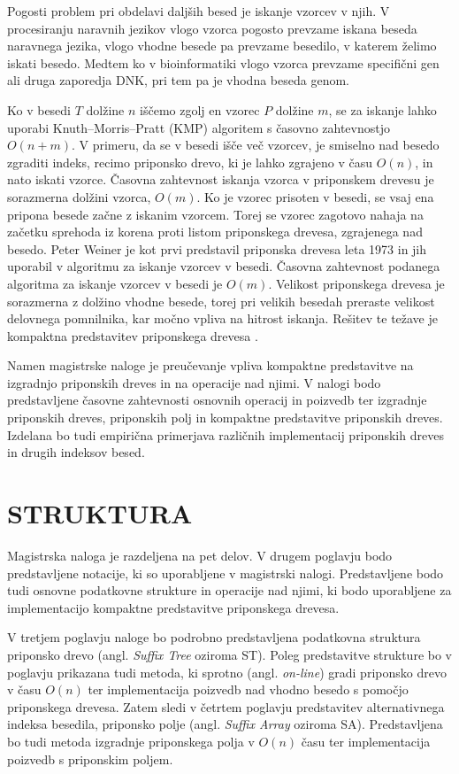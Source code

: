 Pogosti problem pri obdelavi daljših besed je iskanje vzorcev v njih. V procesiranju naravnih jezikov vlogo vzorca pogosto prevzame iskana beseda naravnega jezika, vlogo vhodne besede pa  prevzame besedilo, v katerem želimo iskati besedo. Medtem ko v bioinformatiki vlogo vzorca prevzame specifični gen ali druga zaporedja DNK, pri tem pa je vhodna beseda genom. 

Ko v besedi $T$ dolžine $n$ iščemo zgolj en vzorec $P$ dolžine $m$, se za iskanje lahko uporabi Knuth–Morris–Pratt (KMP) algoritem s časovno zahtevnostjo $O(n+m)$. V primeru, da se v besedi išče več vzorcev, je smiselno nad besedo zgraditi indeks, recimo priponsko drevo, ki je lahko zgrajeno v času $O(n)$, in nato iskati vzorce. Časovna zahtevnost iskanja vzorca v priponskem drevesu je sorazmerna dolžini vzorca, $O(m)$. Ko je vzorec prisoten v besedi, se vsaj ena pripona besede začne z iskanim vzorcem. 
Torej se vzorec zagotovo nahaja na začetku sprehoda iz korena proti listom priponskega drevesa, zgrajenega nad besedo. 
Peter Weiner je kot prvi predstavil priponska drevesa leta 1973 \cite{Weiner1973} in jih uporabil v algoritmu za iskanje vzorcev v besedi. Časovna zahtevnost podanega algoritma za iskanje vzorcev v besedi je $O(m)$. Velikost priponskega drevesa je sorazmerna z dolžino vhodne besede, torej pri velikih besedah preraste velikost delovnega pomnilnika, kar močno vpliva na hitrost iskanja. Rešitev te težave je kompaktna predstavitev priponskega drevesa \cite{Navarro2016}.

Namen magistrske naloge je preučevanje vpliva kompaktne predstavitve na izgradnjo priponskih dreves in na operacije nad njimi. V nalogi bodo predstavljene časovne zahtevnosti osnovnih operacij in poizvedb ter izgradnje priponskih dreves, priponskih polj in kompaktne predstavitve priponskih dreves. Izdelana bo tudi empirična primerjava različnih implementacij priponskih dreves in drugih indeksov besed.

\section{STRUKTURA}\label{sec:struktura}

Magistrska naloga je razdeljena na pet delov. V drugem poglavju bodo predstavljene notacije, ki so uporabljene v magistrski nalogi. Predstavljene bodo tudi osnovne podatkovne strukture in operacije nad njimi, ki bodo uporabljene za implementacijo kompaktne predstavitve priponskega drevesa.

V tretjem poglavju naloge bo podrobno predstavljena podatkovna struktura priponsko drevo (angl. \textit{Suffix Tree} oziroma ST). Poleg predstavitve strukture bo v poglavju prikazana tudi metoda, ki sprotno (angl. \textit{on-line}) gradi priponsko drevo v času $O(n)$ ter implementacija poizvedb nad vhodno besedo s pomočjo priponskega drevesa. Zatem sledi v četrtem poglavju predstavitev alternativnega indeksa besedila, priponsko polje (angl. \textit{Suffix Array} oziroma SA). Predstavljena bo tudi metoda izgradnje priponskega polja v $O(n)$ času ter implementacija poizvedb s priponskim poljem.

